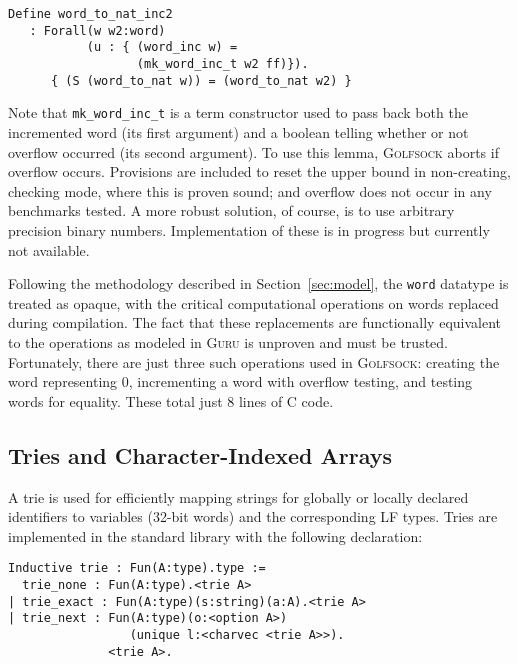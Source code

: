 \documentclass[9pt,natbib]{sigplanconf}
\begin{document}
\begin{verbatim}
Define word_to_nat_inc2
   : Forall(w w2:word)
           (u : { (word_inc w) = 
                  (mk_word_inc_t w2 ff)}).
      { (S (word_to_nat w)) = (word_to_nat w2) }
\end{verbatim}

\noindent Note that \texttt{mk\_word\_inc\_t} is a term constructor
used to pass back both the incremented word (its first argument) and a
boolean telling whether or not overflow occurred (its second
argument).  To use this lemma, \textsc{Golfsock} aborts if overflow
occurs.  Provisions are included to reset the upper bound in
non-creating, checking mode, where this is proven sound; and overflow
does not occur in any benchmarks tested.  A more robust solution, of
course, is to use arbitrary precision binary numbers.  Implementation
of these is in progress but currently not available.

Following the methodology described in Section~\ref{sec:model}, the
\texttt{word} datatype is treated as opaque, with the critical
computational operations on words replaced during compilation.  The
fact that these replacements are functionally equivalent to the
operations as modeled in \textsc{Guru} is unproven and must be
trusted.  Fortunately, there are just three such operations used in
\textsc{Golfsock}: creating the word representing 0, incrementing a
word with overflow testing, and testing words for equality.  These
total just 8 lines of C code.

\subsection{Tries and Character-Indexed Arrays}

A trie is used for efficiently mapping strings for globally or locally
declared identifiers to variables (32-bit words) and the corresponding
LF types.  Tries are implemented in the standard library with the
following declaration:

\begin{verbatim}
Inductive trie : Fun(A:type).type :=
  trie_none : Fun(A:type).<trie A>
| trie_exact : Fun(A:type)(s:string)(a:A).<trie A>
| trie_next : Fun(A:type)(o:<option A>)
                 (unique l:<charvec <trie A>>). 
              <trie A>.
\end{verbatim}
\end{document}
